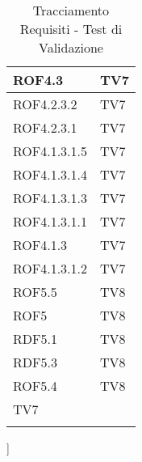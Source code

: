 \begin{center}
\begin{longtable}{|p{7cm}|p{7cm}|}
\midrule
ROF4.3
& TV7\\

\midrule
ROF4.2.3.2
& TV7\\

\midrule
ROF4.2.3.1
& TV7\\

\midrule
ROF4.1.3.1.5
& TV7\\

\midrule
ROF4.1.3.1.4
& TV7\\

\midrule
ROF4.1.3.1.3
& TV7\\

\midrule
ROF4.1.3.1.1
& TV7\\

\midrule
ROF4.1.3
& TV7\\

\midrule
ROF4.1.3.1.2
& TV7\\

\midrule
ROF5.5
& TV8\\

\midrule
ROF5
& TV8\\

\midrule
RDF5.1
& TV8\\

\midrule
RDF5.3
& TV8\\

\midrule
ROF5.4
& TV8\\

\midrule
TV7
& \\

\bottomrule
\caption{Tracciamento Requisiti - Test di Validazione}
\end{longtable}
\end{center}
]

